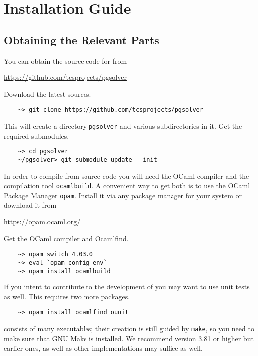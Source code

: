 \section{Installation Guide}

\subsection{Obtaining the Relevant Parts}

You can obtain the source code for \pgsolver from
\begin{center}
    \url{https://github.com/tcsprojects/pgsolver}
\end{center}
Download the latest sources.
\begin{verbatim}
    ~> git clone https://github.com/tcsprojects/pgsolver
\end{verbatim}
This will create a directory \texttt{pgsolver} and various subdirectories in it. Get the required submodules.
\begin{verbatim}
    ~> cd pgsolver
    ~/pgsolver> git submodule update --init
\end{verbatim}

In order to compile \pgsolver from source code you will need the OCaml compiler and the compilation tool \texttt{ocamlbuild}. A convenient way to get
both is to use the OCaml Package Manager \texttt{opam}. Install it via any package manager for your system or download it from
\begin{center}
\url{https://opam.ocaml.org/}
\end{center}
Get the OCaml compiler and Ocamlfind.
\begin{verbatim}
    ~> opam switch 4.03.0 
    ~> eval `opam config env`
    ~> opam install ocamlbuild
\end{verbatim}

If you intent to contribute to the development of \pgsolver you may want to use unit tests as well. This requires two more packages.
\begin{verbatim}
    ~> opam install ocamlfind ounit  
\end{verbatim}
  
\pgsolver consists of many executables; their creation is still guided by \texttt{make}, so you need to make sure that GNU Make
is installed. We recommend version 3.81 or higher but earlier ones, as well as other implementations may suffice as well.


